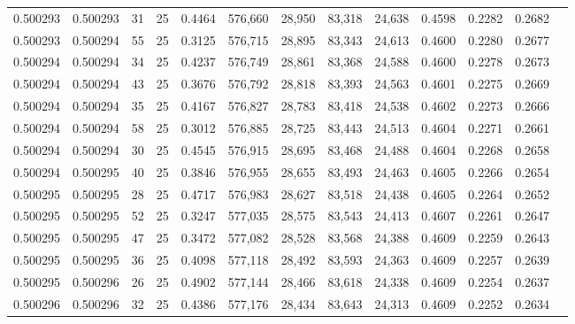 \begin{tabular}{rrrrrrrrrrrrr}
0.500293 & 0.500293 &    31 &  25 &                                     0.4464 & 576,660 &  28,950 &  83,318 &  24,638 & 0.4598 & 0.2282 & 0.2682 \\
0.500293 & 0.500294 &    55 &  25 &                                     0.3125 & 576,715 &  28,895 &  83,343 &  24,613 & 0.4600 & 0.2280 & 0.2677 \\
0.500294 & 0.500294 &    34 &  25 &                                     0.4237 & 576,749 &  28,861 &  83,368 &  24,588 & 0.4600 & 0.2278 & 0.2673 \\
0.500294 & 0.500294 &    43 &  25 &                                     0.3676 & 576,792 &  28,818 &  83,393 &  24,563 & 0.4601 & 0.2275 & 0.2669 \\
0.500294 & 0.500294 &    35 &  25 &                                     0.4167 & 576,827 &  28,783 &  83,418 &  24,538 & 0.4602 & 0.2273 & 0.2666 \\
0.500294 & 0.500294 &    58 &  25 &                                     0.3012 & 576,885 &  28,725 &  83,443 &  24,513 & 0.4604 & 0.2271 & 0.2661 \\
0.500294 & 0.500294 &    30 &  25 &                                     0.4545 & 576,915 &  28,695 &  83,468 &  24,488 & 0.4604 & 0.2268 & 0.2658 \\
0.500294 & 0.500295 &    40 &  25 &                                     0.3846 & 576,955 &  28,655 &  83,493 &  24,463 & 0.4605 & 0.2266 & 0.2654 \\
0.500295 & 0.500295 &    28 &  25 &                                     0.4717 & 576,983 &  28,627 &  83,518 &  24,438 & 0.4605 & 0.2264 & 0.2652 \\
0.500295 & 0.500295 &    52 &  25 &                                     0.3247 & 577,035 &  28,575 &  83,543 &  24,413 & 0.4607 & 0.2261 & 0.2647 \\
0.500295 & 0.500295 &    47 &  25 &                                     0.3472 & 577,082 &  28,528 &  83,568 &  24,388 & 0.4609 & 0.2259 & 0.2643 \\
0.500295 & 0.500295 &    36 &  25 &                                     0.4098 & 577,118 &  28,492 &  83,593 &  24,363 & 0.4609 & 0.2257 & 0.2639 \\
0.500295 & 0.500296 &    26 &  25 &                                     0.4902 & 577,144 &  28,466 &  83,618 &  24,338 & 0.4609 & 0.2254 & 0.2637 \\
0.500296 & 0.500296 &    32 &  25 &                                     0.4386 & 577,176 &  28,434 &  83,643 &  24,313 & 0.4609 & 0.2252 & 0.2634 \\

\end{tabular}
